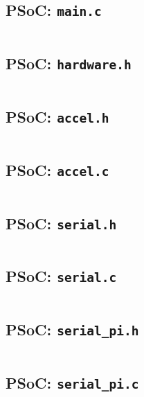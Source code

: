 \documentclass[letterpaper, 11pt]{article}
\begin{document}
\subsection{PSoC: \texttt{main.c}}
\begin{mdframed}[backgroundcolor=bg]
    \inputminted[breaklines]{c}{files/src/psoc/main.c}
\end{mdframed}

\subsection{PSoC: \texttt{hardware.h}}
\begin{mdframed}[backgroundcolor=bg]
    \inputminted[breaklines]{c}{files/src/psoc/hardware.h}
\end{mdframed}

\subsection{PSoC: \texttt{accel.h}}
\begin{mdframed}[backgroundcolor=bg]
    \inputminted[breaklines]{c}{files/src/psoc/accel.h}
\end{mdframed}

\subsection{PSoC: \texttt{accel.c}}
\begin{mdframed}[backgroundcolor=bg]
    \inputminted[breaklines]{c}{files/src/psoc/accel.c}
\end{mdframed}

\subsection{PSoC: \texttt{serial.h}}
\begin{mdframed}[backgroundcolor=bg]
    \inputminted[breaklines]{c}{files/src/psoc/serial.h}
\end{mdframed}

\subsection{PSoC: \texttt{serial.c}}
\begin{mdframed}[backgroundcolor=bg]
    \inputminted[breaklines]{c}{files/src/psoc/serial.c}
\end{mdframed}

\subsection{PSoC: \texttt{serial\_pi.h}}
\begin{mdframed}[backgroundcolor=bg]
    \inputminted[breaklines]{c}{files/src/psoc/serial_pi.h}
\end{mdframed}

\subsection{PSoC: \texttt{serial\_pi.c}}
\begin{mdframed}[backgroundcolor=bg]
    \inputminted[breaklines]{c}{files/src/psoc/serial_pi.c}
\end{mdframed}
\end{document}
